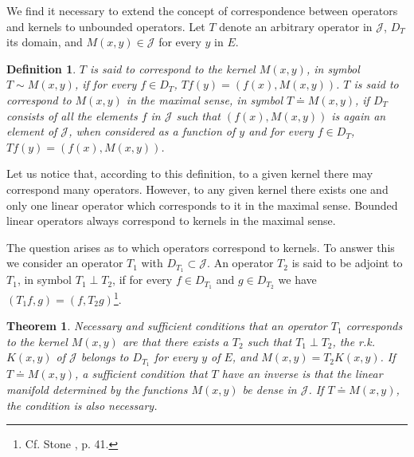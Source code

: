 \documentclass{article}
\newtheorem{theorem}{Theorem}
\newtheorem{definition}{Definition}
\begin{document}
We find it necessary to extend the concept of correspondence between operators and kernels to unbounded operators. Let $T$ denote an arbitrary operator in $\mathcal{J}$, $D_T$ its domain, and $M(x, y) \in \mathcal{J}$ for every $y$ in $E$.

\begin{definition}
\label{def:correspondence}
$T$ is said to correspond to the kernel $M(x, y)$, in symbol $T \sim M(x, y)$, if for every $f \in D_T$, $Tf(y) = (f(x), M(x, y))$. $T$ is said to correspond to $M(x, y)$ in the maximal sense, in symbol $T \doteq M(x, y)$, if $D_T$ consists of all the elements $f$ in $\mathcal{J}$ such that $(f(x), M(x, y))$ is again an element of $\mathcal{J}$, when considered as a function of $y$ and for every $f \in D_T$, $Tf(y) = (f(x), M(x, y))$.
\end{definition}

Let us notice that, according to this definition, to a given kernel there may correspond many operators. However, to any given kernel there exists one and only one linear operator which corresponds to it in the maximal sense. Bounded linear operators always correspond to kernels in the maximal sense.

The question arises as to which operators correspond to kernels. To answer this we consider an operator $T_1$ with $D_{T_1} \subset \mathcal{J}$. An operator $T_2$ is said to be adjoint to $T_1$, in symbol $T_1 \perp T_2$, if for every $f \in D_{T_1}$ and $g \in D_{T_2}$ we have $(T_1f, g) = (f, T_2g)$\footnote{Cf. Stone \cite{stone}, p. 41.}.

\begin{theorem}
\label{thm:correspondence}
Necessary and sufficient conditions that an operator $T_1$ corresponds to the kernel $M(x, y)$ are that there exists a $T_2$ such that $T_1 \perp T_2$, the r.k. $K(x, y)$ of $\mathcal{J}$ belongs to $D_{T_1}$ for every $y$ of $E$, and $M(x, y) = T_2K(x, y)$. If $T \doteq M(x, y)$, a sufficient condition that $T$ have an inverse is that the linear manifold determined by the functions $M(x, y)$ be dense in $\mathcal{J}$. If $T \doteq M(x, y)$, the condition is also necessary.
\end{theorem}
\end{document}
